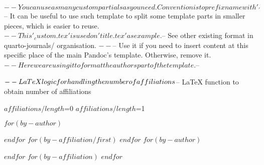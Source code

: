 $-- You can use as many custom partials as you need. Convention is to prefix name with '_'
$-- It can be useful to use such template to split some template parts in smaller pieces, which is easier to reuse.
$-- This '_custom.tex' is used on 'title.tex' as example.
$-- See other existing format in quarto-journals/ organisation.
$-- %
$-- Use it if you need to insert content at this specific place of the main Pandoc's template. Otherwise, remove it.
$-- Here we are using it to format the authors part of the template.
$-- %

$-- LaTeX logic for handling the number of affiliations
\newif\ifnoAffil\noAffilfalse
\newif\ifoneAffil\oneAffilfalse

$-- LaTeX function to obtain number of affiliations
\newcommand{\setNumAffil}[1]{%
    \ifnum#1=0
        \noAffiltrue
    \else
        \ifnum#1=1
            \oneAffiltrue
        \fi
    \fi
}

\setNumAffil{$affiliations/length$}

\ifnoAffil
\author{$for(by-author)$$it.name.literal$$sep$, $endfor$}
\else
\ifoneAffil
$for(by-author)$
\author{$it.name.literal$$if(it.orcid)$~$endif$}
$endfor$
$for(by-affiliation/first)$
$endfor$
\else
$for(by-author)$
\author[$for(it.affiliations)$$it.number$$sep$,$endfor$]{$it.name.literal$$if(it.orcid)$~$endif$}
$endfor$
$for(by-affiliation)$
$endfor$
\fi
\fi

